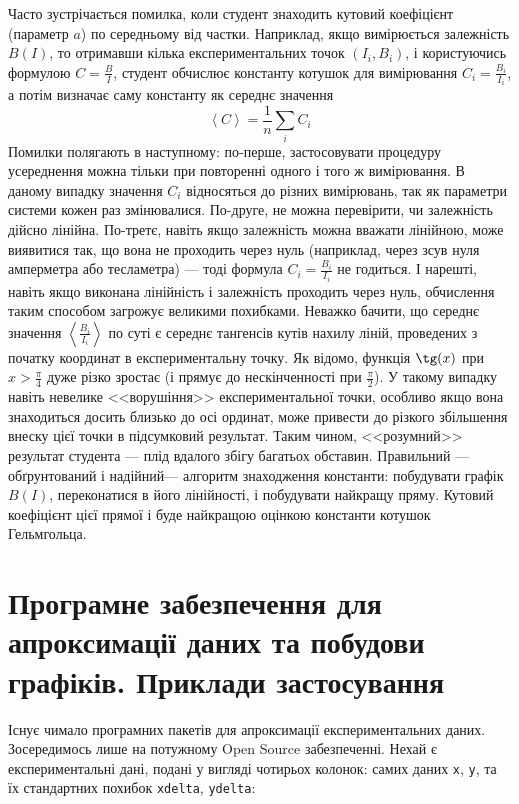 \documentclass{LabBook}
\begin{document}
\begin{Warning}
	Часто зустрічається помилка, коли студент знаходить кутовий коефіцієнт (параметр $a$) по середньому від частки. Наприклад, якщо вимірюється залежність  $B(I)$, то отримавши кілька експериментальних точок $(I_i, B_i)$, і користуючись формулою $C = \frac{B}{I}$, студент обчислює константу котушок для вимірювання $C_i = \frac{B_i}{I_i}$, а потім визначає саму константу як середнє значення
	\[
		\left\langle C \right\rangle = \frac1n \sum\limits_i C_i
	\]
	Помилки полягають в наступному: по-перше, застосовувати процедуру усереднення можна тільки при повторенні одного і того ж вимірювання. В даному випадку значення $C_i$ відносяться до різних вимірювань, так як параметри системи кожен раз змінювалися. По-друге, не можна перевірити, чи залежність дійсно лінійна. По-третє, навіть якщо залежність можна вважати лінійною, може виявитися так, що вона не проходить через нуль (наприклад, через зсув нуля амперметра або тесламетра) --- тоді формула $C_i = \frac{B_i}{I_i}$ не годиться. І нарешті, навіть якщо виконана лінійність і залежність проходить через нуль, обчислення таким способом загрожує великими похибками. Неважко бачити, що середнє значення $\left\langle \frac{B_i}{I_i} \right\rangle$ по суті є середнє тангенсів кутів нахилу ліній, проведених з початку координат в експериментальну точку. Як відомо, функція $\tg(x)$ при $x > \frac{\pi}{4}$ дуже різко зростає (і прямує до нескінченності при $\frac{\pi}{2}$). У такому випадку навіть невелике <<ворушіння>> експериментальної точки, особливо якщо вона знаходиться досить близько до осі ординат, може привести до різкого збільшення внеску цієї точки в підсумковий результат. Таким чином, <<розумний>> результат студента --- плід вдалого збігу багатьох обставин. Правильний --- обґрунтований і надійний--- алгоритм знаходження константи: побудувати графік $B(I)$, переконатися в його лінійності, і побудувати найкращу пряму. Кутовий коефіцієнт цієї прямої і буде найкращою оцінкою константи котушок Гельмгольца.
\end{Warning}


\clearpage
\section{Програмне забезпечення для апроксимації даних та побудови графіків. Приклади застосування}


Існує чимало програмних пакетів для апроксимації експериментальних даних. Зосередимось лише на потужному Open Source забезпеченні.
Нехай є експериментальні дані, подані у вигляді чотирьох колонок: самих даних \texttt{x}, \texttt{y}, та їх стандартних похибок \texttt{xdelta}, \texttt{ydelta}:
\end{document}
